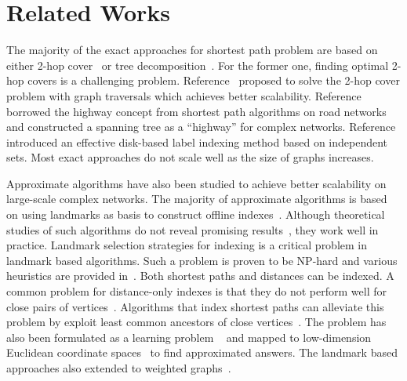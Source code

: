 \section{Related Works}
\label{relatedwork} 

The majority of the exact approaches for shortest path problem are based on either 2-hop cover~\cite{Cohen:2002:RDQ:545381.545503,Akiba:2013:FES:2463676.2465315} or tree decomposition~\cite{Akiba:2012:SQC:2247596.2247614,Wei:2010:TES:1807167.1807181}. For the former one, finding optimal 2-hop covers is a challenging problem. Reference~\cite{Akiba:2013:FES:2463676.2465315} proposed to solve the 2-hop cover problem with graph traversals which achieves better scalability. 
Reference~\cite{Jin:2012:HLA:2213836.2213887} borrowed the highway concept from shortest path algorithms on road networks and constructed a spanning tree as a ``highway'' for complex networks. Reference~\cite{Fu:2013:IIB:2536336.2536346} introduced an effective disk-based label indexing method based on independent sets. Most exact approaches do not scale well as the size of graphs increases.

Approximate algorithms have also been studied to achieve better scalability on large-scale complex networks. The majority of approximate algorithms is based on using landmarks as basis to construct offline indexes~\cite{Thorup:2005:ADO:1044731.1044732,Goldberg:2005:CSP:1070432.1070455,Potamias:2009:FSP:1645953.1646063,floreskul2014memory,Maier:2011:INS:1993077.1993079, das2010sketch}. Although theoretical studies of such algorithms do not reveal promising results~\cite{Thorup:2005:ADO:1044731.1044732}, they work well in practice. Landmark selection strategies for indexing is a critical problem in landmark based algorithms.  Such a problem is proven to be NP-hard and various heuristics are provided in~\cite{Potamias:2009:FSP:1645953.1646063,6927522}. Both shortest paths and distances can be indexed. A common problem for distance-only indexes is that they do not perform well for close pairs of vertices~\cite{Akiba:2012:SQC:2247596.2247614}. Algorithms that index shortest paths can alleviate this problem by exploit least common ancestors of close vertices~\cite{Gubichev:2010:FAE:1871437.1871503,tretyakov2011fast,6399472}. The problem has also been formulated as a learning problem ~\cite{7004250} and mapped to low-dimension Euclidean coordinate spaces~\cite{Zhao:2010:OSP:1863190.1863199} to find approximated answers. The landmark based approaches also extended to weighted graphs~\cite{yang2012finding}.

